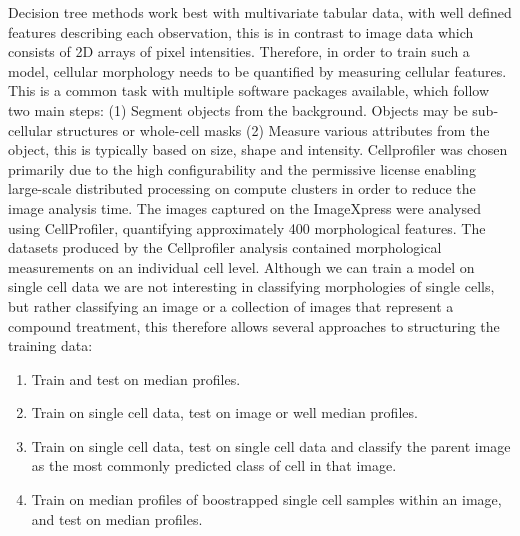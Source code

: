 \documentclass[a4paper,11pt,twoside,openright]{scrbook}
\begin{document}
Decision tree methods work best with multivariate tabular data, with well defined features describing each observation, this is in contrast to image data which consists of 2D arrays of pixel intensities.
Therefore, in order to train such a model, cellular morphology needs to be quantified by measuring cellular features.
This is a common task with multiple software packages available, which follow two main steps: (1) Segment objects from the background. Objects may be sub-cellular structures or whole-cell masks (2) Measure various attributes from the object, this is typically based on size, shape and intensity.
Cellprofiler \cite{cellprofiler_paper} was chosen primarily due to the high configurability and the permissive license enabling large-scale distributed processing on compute clusters in order to reduce the image analysis time.
The images captured on the ImageXpress were analysed using CellProfiler, quantifying approximately 400 morphological features.
The datasets produced by the Cellprofiler analysis contained morphological measurements on an individual cell level.
Although we can train a model on single cell data we are not interesting in classifying morphologies of single cells, but rather classifying an image or a collection of images that represent a compound treatment, this therefore allows several approaches to structuring the training data:

\begin{enumerate}
    \item Train and test on median profiles.
    \item Train on single cell data, test on image or well median profiles.
    \item Train on single cell data, test on single cell data and classify the parent image as the most commonly predicted class of cell in that image.
    \item Train on median profiles of boostrapped single cell samples within an image, and test on median profiles.
\end{enumerate}



\end{document}
